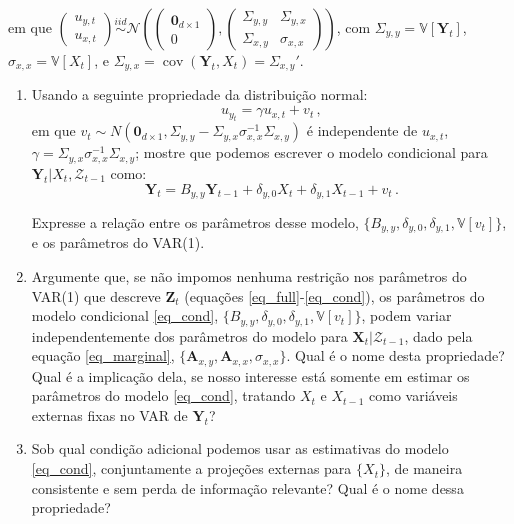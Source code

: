 \documentclass[10pt,a4paper]{article}
\begin{document}
\begin{enumerate}
em que $\begin{pmatrix}
	u_{y,t} \\
	u_{x,t}
	\end{pmatrix} \overset{iid}{\sim} \mathcal{N}\left(\begin{pmatrix}\boldsymbol{0}_{d\times 1} \\ 0\end{pmatrix},\begin{pmatrix}
\Sigma_{y,y} & \Sigma_{y,x} \\
\Sigma_{x,y}& \sigma_{x,x}
	\end{pmatrix}\right)$, com $\Sigma_{y,y} = \mathbb{V}[\boldsymbol{Y}_t]$, $\sigma_{x,x} = \mathbb{V}[X_t]$, e $\Sigma_{y,x} = \operatorname{cov}(\boldsymbol{Y}_t,X_t) = \Sigma_{x,y}'$.
	
	\begin{enumerate}
		\item Usando a seguinte propriedade da distribuição normal:
		$$u_{y_t} = \gamma u_{x,t} + v_t\, ,$$
		em que $v_t \sim N(\boldsymbol{0}_{d\times 1}, \Sigma_{y,y} - \Sigma_{y,x}\sigma_{x,x}^{-1}\Sigma_{x,y})$ é independente de $u_{x,t}$, $\gamma = \Sigma_{y,x}\sigma_{x,x}^{-1} \Sigma_{x,y}$; mostre que podemos escrever o modelo condicional para $\boldsymbol{Y}_t|X_t,\mathcal{Z}_{t-1}$ como:
	\begin{equation}
		\label{eq_cond}
		\boldsymbol{Y}_t = {B}_{y,y}\boldsymbol{Y}_{t-1} +\delta_{y,0}X_t + \delta_{y,1} X_{t-1}+ v_{t}\, .
	\end{equation}
	
	Expresse a relação entre os parâmetros desse modelo, $\{B_{y,y}, \delta_{y,0}, \delta_{y,1}, \mathbb{V}[v_t]\}$, e os parâmetros do VAR(1).
	\item Argumente que, se não impomos nenhuma restrição nos parâmetros do VAR(1) que descreve $\boldsymbol{Z}_t$ (equações \eqref{eq_full}-\eqref{eq_cond}), os parâmetros do modelo condicional \eqref{eq_cond},  $\{B_{y,y}, \delta_{y,0}, \delta_{y,1}, \mathbb{V}[v_t]\}$,  podem variar independentemente dos parâmetros do modelo para $\boldsymbol{X}_t|\mathcal{Z}_{t-1}$, dado pela equação \eqref{eq_marginal}, $\{\boldsymbol{A}_{x,y}, \boldsymbol{A}_{x,x}, \sigma_{x,x}\}$. Qual é o nome desta propriedade? Qual é a implicação dela, se nosso interesse está somente em estimar os parâmetros do modelo \eqref{eq_cond}, tratando $X_t$ e $X_{t-1}$ como variáveis externas fixas no VAR de $\boldsymbol{Y}_t$?
	\item Sob qual condição adicional podemos usar as estimativas do modelo \eqref{eq_cond}, conjuntamente a projeções externas para $\{X_t\}$, de maneira consistente e sem perda de informação relevante? Qual é o nome dessa propriedade?
		

\end{enumerate}
\end{enumerate}
\end{document}
